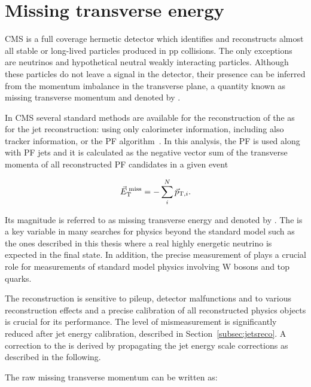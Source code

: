 \section{Missing transverse energy}\label{sec:met}

CMS is a full coverage hermetic detector which identifies and reconstructs almost all stable or long-lived particles produced in pp collisions. 
The only exceptions are neutrinos and hypothetical neutral weakly interacting particles.
Although these particles do not leave a signal in the detector, their presence can be inferred from the momentum imbalance in the transverse plane,
a quantity known as missing transverse momentum and denoted by \VEtmiss.

In CMS several standard methods are available for the reconstruction of the \VEtmiss as for the jet reconstruction: using only calorimeter information, including also tracker information, or the PF algorithm~\cite{1748-0221-6-09-P09001}. 
In this analysis, the PF \VEtmiss is used along with PF jets and it is calculated as the negative vector sum of the transverse momenta of all reconstructed PF candidates in a given event

\begin{equation}
{\vec E}_{\mathrm{T}}^{\;\text{miss}} = -\sum_{i}^{N}{\vec p}_{\mathrm{T},i}.
\end{equation}

Its magnitude is referred to as missing transverse energy and denoted by \ETmiss.
The \ETmiss is a key variable in many searches for physics beyond the standard model such as the ones described in this thesis where a real highly energetic neutrino is expected in the final state.
In addition, the precise measurement of \ETmiss plays a crucial role for measurements of standard model physics involving W bosons and top quarks.

The \VEtmiss reconstruction is sensitive to pileup, detector malfunctions and to various reconstruction effects and a precise calibration of all reconstructed physics objects is crucial for its performance.
The level of mismeasurement is significantly reduced after jet energy calibration, described in Section~\ref{subsec:jetsreco}.
A correction to the \VEtmiss is derived by propagating the jet energy scale corrections as described in the following.

The raw missing transverse momentum can be written as:

